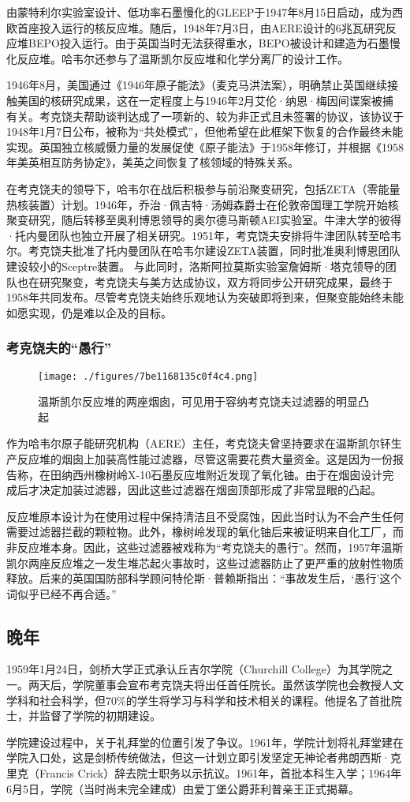由蒙特利尔实验室设计、低功率石墨慢化的GLEEP于1947年8月15日启动，成为西欧首座投入运行的核反应堆。随后，1948年7月3日，由AERE设计的6兆瓦研究反应堆BEPO投入运行。由于英国当时无法获得重水，BEPO被设计和建造为石墨慢化反应堆。哈韦尔还参与了温斯凯尔反应堆和化学分离厂的设计工作。

1946年8月，美国通过《1946年原子能法》（麦克马洪法案），明确禁止英国继续接触美国的核研究成果，这在一定程度上与1946年2月艾伦·纳恩·梅因间谍案被捕有关。考克饶夫帮助谈判达成了一项新的、较为非正式且未签署的协议，该协议于1948年1月7日公布，被称为“共处模式”，但他希望在此框架下恢复的合作最终未能实现。英国独立核威慑力量的发展促使《原子能法》于1958年修订，并根据《1958年美英相互防务协定》，美英之间恢复了核领域的特殊关系。

在考克饶夫的领导下，哈韦尔在战后积极参与前沿聚变研究，包括ZETA（零能量热核装置）计划。1946年，乔治·佩吉特·汤姆森爵士在伦敦帝国理工学院开始核聚变研究，随后转移至奥利博恩领导的奥尔德马斯顿AEI实验室。牛津大学的彼得·托内曼团队也独立开展了相关研究。1951年，考克饶夫安排将牛津团队转至哈韦尔。考克饶夫批准了托内曼团队在哈韦尔建设ZETA装置，同时批准奥利博恩团队建设较小的Sceptre装置。
与此同时，洛斯阿拉莫斯实验室詹姆斯·塔克领导的团队也在研究聚变，考克饶夫与美方达成协议，双方将同步公开研究成果，最终于1958年共同发布。尽管考克饶夫始终乐观地认为突破即将到来，但聚变能始终未能如愿实现，仍是难以企及的目标。
\subsubsection{考克饶夫的“愚行”}
\begin{figure}[ht]
\centering
\texttt{[image: ./figures/7be1168135c0f4c4.png]}
\caption{温斯凯尔反应堆的两座烟囱，可见用于容纳考克饶夫过滤器的明显凸起} \label{fig_YHkrf_7}
\end{figure}
作为哈韦尔原子能研究机构（AERE）主任，考克饶夫曾坚持要求在温斯凯尔钚生产反应堆的烟囱上加装高性能过滤器，尽管这需要花费大量资金。这是因为一份报告称，在田纳西州橡树岭X-10石墨反应堆附近发现了氧化铀。由于在烟囱设计完成后才决定加装过滤器，因此这些过滤器在烟囱顶部形成了非常显眼的凸起。

反应堆原本设计为在使用过程中保持清洁且不受腐蚀，因此当时认为不会产生任何需要过滤器拦截的颗粒物。此外，橡树岭发现的氧化铀后来被证明来自化工厂，而非反应堆本身。因此，这些过滤器被戏称为“考克饶夫的愚行”。然而，1957年温斯凯尔两座反应堆之一发生堆芯起火事故时，这些过滤器防止了更严重的放射性物质释放。后来的英国国防部科学顾问特伦斯·普赖斯指出：“事故发生后，‘愚行’这个词似乎已经不再合适。”
\subsection{晚年}
1959年1月24日，剑桥大学正式承认丘吉尔学院（Churchill College）为其学院之一。两天后，学院董事会宣布考克饶夫将出任首任院长。虽然该学院也会教授人文学科和社会科学，但70\%的学生将学习与科学和技术相关的课程。他提名了首批院士，并监督了学院的初期建设。

学院建设过程中，关于礼拜堂的位置引发了争议。1961年，学院计划将礼拜堂建在学院入口处，这是剑桥传统做法，但这一计划立即引发坚定无神论者弗朗西斯·克里克（Francis Crick）辞去院士职务以示抗议。1961年，首批本科生入学；1964年6月5日，学院（当时尚未完全建成）由爱丁堡公爵菲利普亲王正式揭幕。